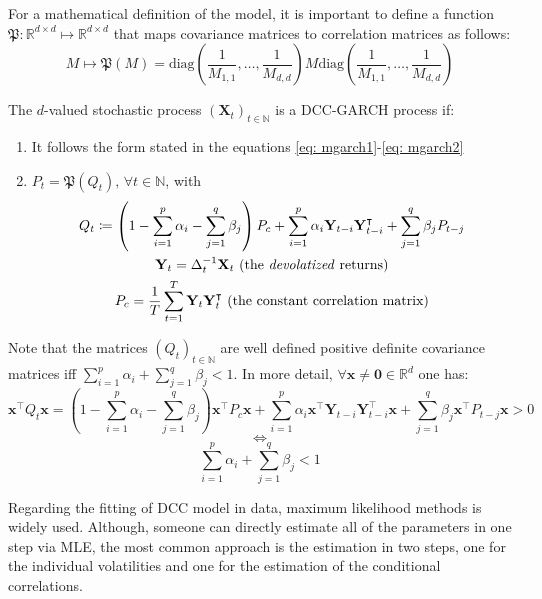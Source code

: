 \documentclass[a4paper, oneside]{discothesis}
\begin{document}
For a mathematical definition of the model, it is important to define a function $\mathfrak{P}: \mathbb{R}^{d\times d}\mapsto\mathbb{R}^{d\times d}$ that maps covariance matrices to correlation matrices as follows:
\begin{equation}
    M \longmapsto\mathfrak{P}(M) = \text{diag}\left(\frac{1}{M_{1,1}}, \dots, \frac{1}{M_{d,d}}\right)M  \text{diag}\left(\frac{1}{M_{1,1}}, \dots, \frac{1}{M_{d,d}}\right)
\end{equation}
\begin{definition}
The $d$-valued stochastic process $(\mathbf{X}_t)_{t\in\mathbb{N}}$ is a DCC-GARCH process if:
\begin{enumerate}
    \item  It follows the form stated in the equations \ref{eq: mgarch1}-\ref{eq: mgarch2}
    \item $P_t = \mathfrak{P}(Q_t) \text{, }\forall t\in\mathbb{N}$, with 
    \begin{gather}
        Q_t\coloneqq \left(1-\sum_{i=1}^p \alpha_i - \sum_{j=1}^q \beta_j\right)P_c+\sum_{i=1}^p\alpha_i\mathbf{Y}_{t-i}\mathbf{Y}_{t-i}^\intercal + \sum_{j=1}^q\beta_j P_{t-j}\\\mathbf{Y}_t= \Delta_t^{-1}\mathbf{X}_t\text{   (the \textit{devolatized} returns)}\\
        P_c = \frac{1}{T}\sum_{t=1}^T \mathbf{Y}_t\mathbf{Y}_t^\intercal\text{   (the constant correlation matrix)}
    \end{gather}
\end{enumerate}
\end{definition}
  \begin{mdframed}\begin{remark}
Note that the matrices $(Q_t)_{t\in\mathbb{N}}$ are well defined positive definite covariance matrices iff $\sum_{i=1}^p \alpha_i + \sum_{j=1}^q \beta_j<1$. In more detail,  $\forall \mathbf{x}\neq\mathbf{0}\in\mathbb{R}^d$ one has:
\scriptsize
\[\mathbf{x}^\intercal Q_t\mathbf{x} = \left(1-\sum_{i=1}^p \alpha_i - \sum_{j=1}^q \beta_j\right)\mathbf{x}^\intercal P_c\mathbf{x}+\sum_{i=1}^p\alpha_i\mathbf{x}^\intercal\mathbf{Y}_{t-i}\mathbf{Y}_{t-i}^\intercal\mathbf{x} + \sum_{j=1}^q\beta_j \mathbf{x}^\intercal P_{t-j}\mathbf{x}>0\]\[\Longleftrightarrow\]\[\sum_{i=1}^p \alpha_i + \sum_{j=1}^q \beta_j<1\]
\end{remark}\end{mdframed}  
\normalsize

Regarding the fitting of DCC model in data, maximum likelihood methods is widely used. Although, someone can directly estimate all of the parameters in one step via MLE, the most common approach is the estimation in two steps, one for the individual volatilities and one for the estimation of the conditional correlations. 
\end{document}

